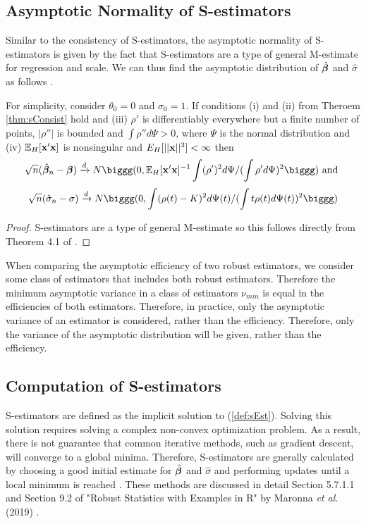 \subsection{Asymptotic Normality of S-estimators}

Similar to the consistency of S-estimators, the asymptotic normality of S-estimators is given by the fact that S-estimators are a type of general M-estimate for regression and scale. We can thus find the asymptotic distribution of $\hat{\bm{\beta}}$ and $\hat\sigma$ as follows \cite{rousseeuw1984robust}.
\begin{thm}
For simplicity, consider $\theta_0 = 0$ and $\sigma_0=1$. If conditions (i) and (ii) from Theroem \ref{thm:sConsist} hold and (iii) $\rho'$ is differentiably everywhere but a finite number of points, $|\rho''|$ is bounded and $\int \rho'' d\Psi > 0$, where $\Psi$ is the normal distribution and (iv) $\mathbb{E}_H[\mathbf{x}'\mathbf{x}]$ is nonsingular and $E_H[||\mathbf{x}||^3] < \infty$ then
\begin{equation}
    \sqrt{n} (\hat\bb_n - \bb) \xrightarrow{d} N\biggg(0, \E_H[\bx'\bx]^{-1} \int (\rho')^2d\Psi / (\int\rho' d\Psi)^2\biggg)\text{ and }
\end{equation}
\begin{equation}
    \sqrt{n} (\hat\sigma_n - \sigma) \xrightarrow{d} N\biggg(0, \int (\rho(t) - K)^2d\Psi(t) / (\int t\rho(t) d\Psi(t))^2\biggg)
\end{equation}
\end{thm}
\begin{proof}
S-estimators are a type of general M-estimate so this follows directly from Theorem 4.1 of \cite{maronna1981asymptotic}.
\end{proof}
When comparing the asymptotic efficiency of two robust estimators, we consider some class of estimators that includes both robust estimators. Therefore the minimum asymptotic variance in a class of estimators $\nu_{min}$ is equal in the efficiencies of both estimators. Therefore, in practice, only the asymptotic variance of an estimator is considered, rather than the efficiency. Therefore, only the variance of the asymptotic distribution will be given, rather than the efficiency.

\subsection{Computation of S-estimators}
S-estimators are defined as the implicit solution to (\ref{def:sEst}). Solving this solution requires solving a complex non-convex optimization problem. As a result, there is not guarantee that common iterative methods, such as gradient descent, will converge to a global minima. Therefore, S-estimators are gnerally calculated by choosing a good initial estimate for $\hat{\bm{\beta}}$ and $\hat\sigma$ and performing updates until a local minimum is reached \cite{maronna2019robust}. These methods are discussed in detail Section 5.7.1.1 and Section 9.2 of "Robust Statistics with Examples in R" by Maronna \textit{et al.} (2019) \cite{maronna2019robust}.

